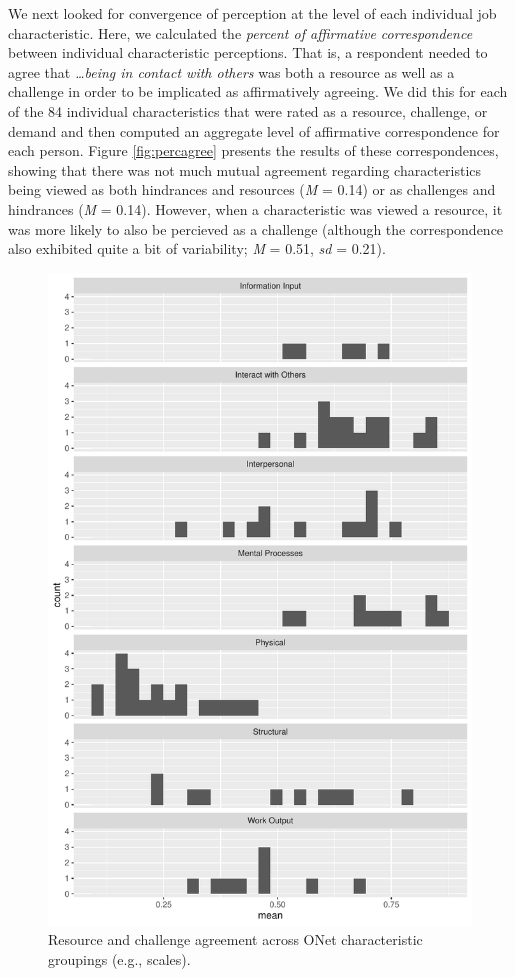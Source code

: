 \documentclass[
  man]{apa6}
\begin{document}
We next looked for convergence of perception at the level of each individual job characteristic. Here, we calculated the \emph{percent of affirmative correspondence} between individual characteristic perceptions. That is, a respondent needed to agree that \emph{\ldots being in contact with others} was both a resource as well as a challenge in order to be implicated as affirmatively agreeing. We did this for each of the 84 individual characteristics that were rated as a resource, challenge, or demand and then computed an aggregate level of affirmative correspondence for each person. Figure \ref{fig:percagree} presents the results of these correspondences, showing that there was not much mutual agreement regarding characteristics being viewed as both hindrances and resources (\emph{M} = 0.14) or as challenges and hindrances
(\emph{M} = 0.14). However, when a characteristic was viewed a resource, it was more likely to also be percieved as a challenge (although the correspondence also exhibited quite a bit of variability; \emph{M} = 0.51, \emph{sd} = 0.21).

\begin{figure}
\centering
\includegraphics{copy-of-SIOP2023convergence_files/figure-latex/recchall-1.pdf}
\caption{\label{fig:recchall}Resource and challenge agreement across ONet characteristic groupings (e.g., scales).}
\end{figure}
\end{document}
